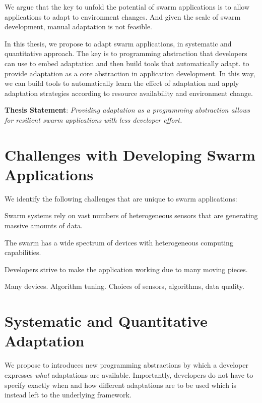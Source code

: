 \documentclass[thesis.tex]{subfiles}
\begin{document}
We argue that the key to unfold the potential of swarm applications is to allow
applications to adapt to environment changes. And given the scale of swarm
development, manual adaptation is not feasible.

In this thesis, we propose to adapt swarm applications, in systematic and
quantitative approach. The key is to programming abstraction that developers can
use to embed adaptation and then build tools that automatically adapt. to
provide adaptation as a core abstraction in application development. In this
way, we can build tools to automatically learn the effect of adaptation and
apply adaptation strategies according to resource availability and environment
change.

\vspace{1em}

\noindent\textbf{Thesis Statement}: \textit{Providing adaptation as a programming
  abstraction allows for resilient swarm applications with less developer
  effort.}

\vspace{1em}

\section{Challenges with Developing Swarm Applications}
\label{sec:chall-with-exist}

We identify the following challenges that are unique to swarm applications:

 Swarm systems rely on vast numbers of
heterogeneous sensors that are generating massive amounts of data.

 The swarm has a wide spectrum of devices with
heterogeneous computing capabilities.

 Developers strive to make the application working due
to many moving pieces.

 Many devices. Algorithm tuning. Choices of sensors,
algorithms, data quality.

\section{Systematic and Quantitative Adaptation}
\label{sec:adaptation}

 We propose to introduces new programming
abstractions by which a developer expresses \emph{what} adaptations are
available. Importantly, developers do not have to specify exactly when and how
different adaptations are to be used which is instead left to the underlying
framework.
\end{document}
